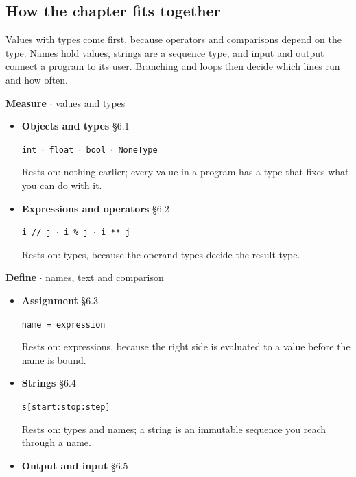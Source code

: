 \documentclass[11pt]{article}
\begin{document}
\begin{keepsection}
\section{How the chapter fits together}

Values with types come first, because operators and comparisons depend on the type. Names hold values, strings are a sequence type, and input and output connect a program to its user. Branching and loops then decide which lines run and how often.

\textbf{Measure} \ensuremath{\cdot} values and types

\begin{itemize}
\item {}
\textbf{Objects and types} \hfill{\small\color{FAUblue}§6.1}

\texttt{int \ensuremath{\cdot} float \ensuremath{\cdot} bool \ensuremath{\cdot} NoneType}

Rests on: nothing earlier; every value in a program has a type that fixes what you can do with it.
\item {}
\textbf{Expressions and operators} \hfill{\small\color{FAUblue}§6.2}

\texttt{i // j \ensuremath{\cdot} i \% j \ensuremath{\cdot} i ** j}

Rests on: types, because the operand types decide the result type.
\end{itemize}

\textbf{Define} \ensuremath{\cdot} names, text and comparison

\begin{itemize}
\item {}
\textbf{Assignment} \hfill{\small\color{FAUblue}§6.3}

\texttt{name = expression}

Rests on: expressions, because the right side is evaluated to a value before the name is bound.
\item {}
\textbf{Strings} \hfill{\small\color{FAUblue}§6.4}

\texttt{s[start:stop:step]}

Rests on: types and names; a string is an immutable sequence you reach through a name.
\item {}
\textbf{Output and input} \hfill{\small\color{FAUblue}§6.5}


\end{itemize}
\end{keepsection}
\end{document}
